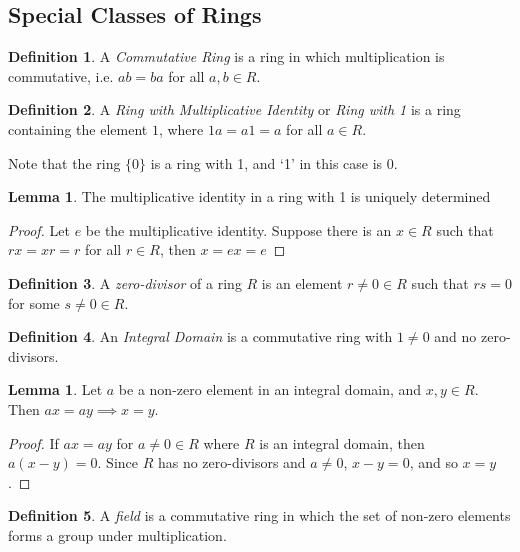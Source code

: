 \documentclass{article}
\theoremstyle{definition}
\newtheorem{definition}{Definition}[section]
\newtheorem{lemma}[theorem]{Lemma}
\begin{document}
  \subsection{Special Classes of Rings}

  \begin{definition}
    A \emph{Commutative Ring} is a ring in which multiplication is commutative,
    i.e. $ab = ba$ for all $a, b \in R$.
  \end{definition}

  \begin{definition}
    A \emph{Ring with Multiplicative Identity} or \emph{Ring with 1} is
    a ring containing the element $1$, where $1a = a1 = a$ for all
    $a \in R$.
  \end{definition}

  Note that the ring $\lbrace 0 \rbrace$ is a ring with 1, and `1' in this case is $0$.

  \begin{lemma}
    The multiplicative identity in a ring with 1 is uniquely determined
  \end{lemma}
  \begin{proof}
    Let $e$ be the multiplicative identity. Suppose there is an $x \in R$ such
    that $rx = xr = r$ for all $r \in R$, then $x = ex = e$
  \end{proof}

  \begin{definition}
    A \emph{zero-divisor} of a ring $R$ is an element $r \neq 0 \in R$ such
    that $rs = 0$ for some $s \neq 0 \in R$.
  \end{definition}

  \begin{definition}
    An \emph{Integral Domain} is a commutative ring with $1 \neq 0$ and no zero-divisors.
  \end{definition}

  \begin{lemma}
    Let $a$ be a non-zero element in an integral domain, and $x, y \in R$.
    Then $ax = ay \implies x = y$.
  \end{lemma}

  \begin{proof}
    If $ax = ay$ for $a \neq 0 \in R$ where $R$ is an integral domain, then
    $a(x-y) = 0$. Since $R$ has no zero-divisors and $a \neq 0$, $x-y = 0$,
    and so $x = y$.
  \end{proof}

  \begin{definition}
    A \emph{field} is a commutative ring in which the set of non-zero elements
    forms a group under multiplication.
  \end{definition}
\end{document}
